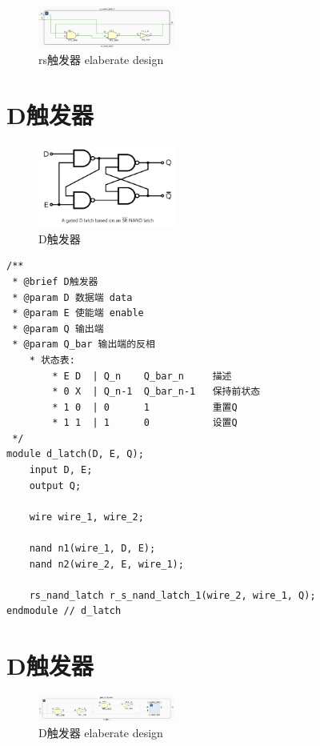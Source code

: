 \documentclass[AutoFakeBold]{LZUThesis}
\begin{document}
\begin{figure}[htbp]
    \centering
    \includegraphics[width=0.4\textwidth]{img/RS_latch_ele}
    \caption{rs触发器 elaberate design}
\end{figure}

\section{D触发器}
\begin{figure}[htbp]
    \centering
    \includegraphics[width=0.4\textwidth]{img/D_latch}
    \caption{D触发器}
\end{figure}

\begin{lstlisting}[style={verilog-style}]
/**
 * @brief D触发器
 * @param D 数据端 data
 * @param E 使能端 enable
 * @param Q 输出端
 * @param Q_bar 输出端的反相
    * 状态表:
        * E	D  | Q_n	Q_bar_n	    描述
        * 0	X  | Q_n-1	Q_bar_n-1	保持前状态
        * 1	0  | 0	    1	        重置Q
        * 1	1  | 1	    0	        设置Q
 */
module d_latch(D, E, Q);
    input D, E;
    output Q;

    wire wire_1, wire_2;

    nand n1(wire_1, D, E);
    nand n2(wire_2, E, wire_1);

    rs_nand_latch r_s_nand_latch_1(wire_2, wire_1, Q);
endmodule // d_latch
\end{lstlisting}

\section{D触发器}
\begin{figure}[htbp]
    \centering
    \includegraphics[width=0.4\textwidth]{img/D_latch_ele}
    \caption{D触发器 elaberate design}
\end{figure}
\end{document}

